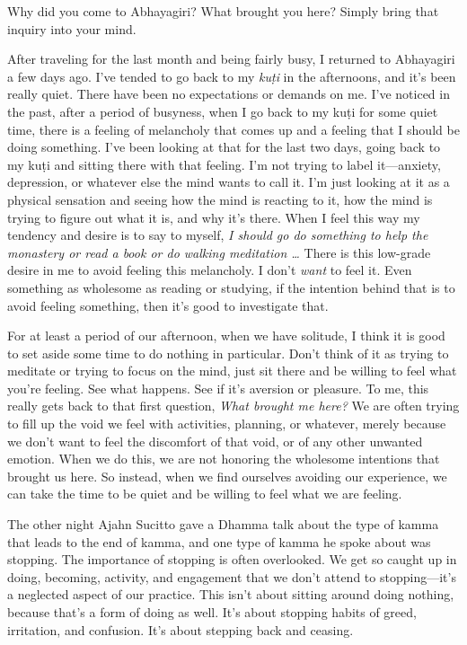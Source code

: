 
Why did you come to Abhayagiri? What brought you here? Simply bring 
that inquiry into your mind.

After traveling for the last month and being fairly busy, I returned to 
Abhayagiri a few days ago. I've tended to go back to my \emph{kuṭi} 
in the afternoons, and it's been really quiet. There have been no 
expectations or demands on me. I've noticed in the past, after a period 
of busyness, when I go back to my kuṭi for some quiet time, there is 
a feeling of melancholy that comes up and a feeling that I should be 
doing something. I've been looking at that for the last two days, going 
back to my kuṭi and sitting there with that feeling. I'm not trying 
to label it---anxiety, depression, or whatever else the mind wants to 
call it. I'm just looking at it as a physical sensation and seeing how 
the mind is reacting to it, how the mind is trying to figure out what 
it is, and why it's there. When I feel this way my tendency and desire 
is to say to myself, \emph{I should go do something to help the 
monastery or read a book or do walking meditation \ldots{}} There is 
this low-grade desire in me to avoid feeling this melancholy. I don't 
\emph{want} to feel it. Even something as wholesome as reading or 
studying, if the intention behind that is to avoid feeling something, 
then it's good to investigate that.

For at least a period of our afternoon, when we have solitude, I think
it is good to set aside some time to do nothing in particular. Don't
think of it as trying to meditate or trying to \mbox{focus} on the mind,
just sit there and be willing to feel what you're feeling. See what
happens.  See if it's aversion or pleasure. To me, this really gets back
to that first question, \emph{What brought me here?} We are often trying
to fill up the void we feel with activities, planning, or whatever,
merely because we don't want to feel the discomfort of that void, or of
any other unwanted emotion. When we do this, we are not honoring the
wholesome intentions that brought us here. So instead, when we find
ourselves avoiding our experience, we can take the time to be quiet and
be willing to feel what we are feeling.


The other night Ajahn Sucitto gave a Dhamma talk about the type of 
kamma that leads to the end of kamma, and one type of kamma he spoke 
about was stopping. The importance of stopping is often overlooked. We 
get so caught up in doing, becoming, activity, and engagement that we 
don't attend to stopping---it's a neglected aspect of our practice. 
This isn't about sitting around doing nothing, because that's a form of 
doing as well. It's about stopping habits of greed, irritation, and 
confusion. It's about stepping back and ceasing.

